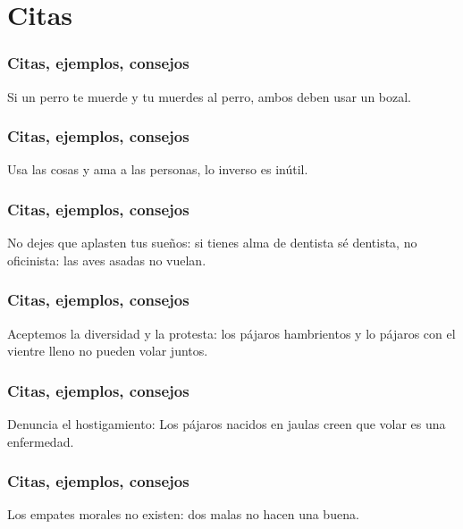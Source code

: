 \documentclass[12pt,spanish,x11names,svgnames]{beamer}
\begin{document}
\section{Citas}
\begin{frame}
  \frametitle{Citas, ejemplos, consejos}
\begin{block}{}
  Si un perro te muerde y tu muerdes al perro, ambos deben usar un bozal.
\end{block}
\end{frame}
\begin{frame}
  \frametitle{Citas, ejemplos, consejos}
  \begin{block}{}
    Usa las cosas y ama a las personas, lo inverso es inútil.
  \end{block}
\end{frame}
\begin{frame}
  \frametitle{Citas, ejemplos, consejos}
  \begin{block}{}
    No dejes que aplasten tus sueños: si tienes alma de dentista sé dentista, no oficinista: las aves asadas no vuelan.
  \end{block}
\end{frame}
\begin{frame}
  \frametitle{Citas, ejemplos, consejos}
  \begin{block}{}
    Aceptemos la diversidad y la protesta: los pájaros hambrientos y lo pájaros con el vientre lleno no pueden volar juntos.
  \end{block}
\end{frame}
\begin{frame}
  \frametitle{Citas, ejemplos, consejos}
  \begin{block}{}
    Denuncia el hostigamiento: Los pájaros nacidos en jaulas creen que volar es una enfermedad. 
  \end{block}
\end{frame}
\begin{frame}
  \frametitle{Citas, ejemplos, consejos}
  \begin{block}{}
    Los empates morales no existen: dos malas no hacen una buena.
  \end{block}
\end{frame}
\end{document}
